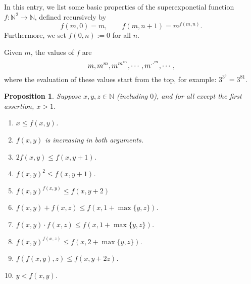 \documentclass[12pt]{article}
\newtheorem{prop}{Proposition}
\begin{document}
In this entry, we list some basic properties of the superexponetial function $f:\mathbb{N}^2 \to \mathbb{N}$, defined recursively by $$f(m,0)=m,\qquad f(m,n+1)=m^{f(m,n)}.$$
Furthermore, we set $f(0,n):=0$ for all $n$.

Given $m$, the values of $f$ are $$m, m^m, m^{m^m}, \cdots, m^{\ldotp \cdotp ^m}, \cdots,$$ where the evaluation of these values start from the top, for example: $3^{3^3}=3^{81}$.

\begin{prop}  Suppose $x,y,z\in \mathbb{N}$ (including $0$), and for all except the first assertion, $x>1$.
\begin{enumerate}
\item $x \le f(x,y)$.
\item $f(x,y)$ is increasing in both arguments.
\item $2f(x,y)\le f(x,y+1)$.
\item $f(x,y)^2 \le f(x,y+1)$.
\item $f(x,y)^{f(x,y)} \le f(x,y+2)$
\item $f(x,y)+f(x,z) \le f(x,1+\max\lbrace y,z\rbrace)$.
\item $f(x,y)\cdot f(x,z)\le f(x,1+\max\lbrace y,z\rbrace)$.
\item $f(x,y)^{f(x,z)} \le f(x,2+\max\lbrace y,z\rbrace)$.
\item $f(f(x,y),z) \le f(x, y+2z)$.
\item $y < f(x,y)$.
\end{enumerate}
\end{prop}
\end{document}
